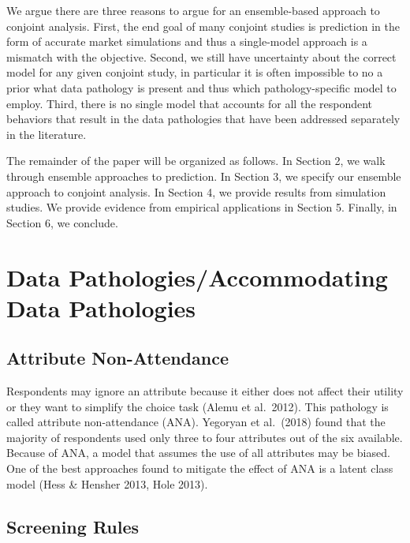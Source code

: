 \documentclass[12pt,titlepage]{mktg-article}
\begin{document}
We argue there are three reasons to argue for an ensemble-based approach to conjoint analysis. First, the end goal of many conjoint studies is prediction in the form of accurate market simulations and thus a single-model approach is a mismatch with the objective. Second, we still have uncertainty about the correct model for any given conjoint study, in particular it is often impossible to no a prior what data pathology is present and thus which pathology-specific model to employ. Third, there is no single model that accounts for all the respondent behaviors that result in the data pathologies that have been addressed separately in the literature.

The remainder of the paper will be organized as follows. In Section 2, we walk through ensemble approaches to prediction. In Section 3, we specify our ensemble approach to conjoint analysis. In Section 4, we provide results from simulation studies. We provide evidence from empirical applications in Section 5. Finally, in Section 6, we conclude.

\hypertarget{data-pathologiesaccommodating-data-pathologies}{%
\section{Data Pathologies/Accommodating Data Pathologies}\label{data-pathologiesaccommodating-data-pathologies}}

\hypertarget{attribute-non-attendance}{%
\subsection{Attribute Non-Attendance}\label{attribute-non-attendance}}

Respondents may ignore an attribute because it either does not affect their utility or they want to simplify the choice task (Alemu et al.~2012). This pathology is called attribute non-attendance (ANA). Yegoryan et al.~(2018) found that the majority of respondents used only three to four attributes out of the six available. Because of ANA, a model that assumes the use of all attributes may be biased. One of the best approaches found to mitigate the effect of ANA is a latent class model (Hess \& Hensher 2013, Hole 2013).

\hypertarget{screening-rules}{%
\subsection{Screening Rules}\label{screening-rules}}
\end{document}
